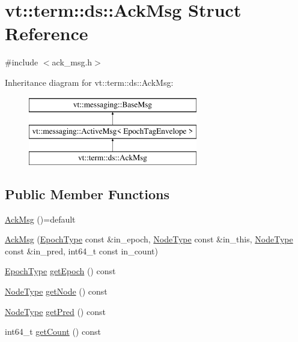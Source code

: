 \hypertarget{structvt_1_1term_1_1ds_1_1_ack_msg}{}\section{vt\+:\+:term\+:\+:ds\+:\+:Ack\+Msg Struct Reference}
\label{structvt_1_1term_1_1ds_1_1_ack_msg}


{\ttfamily \#include $<$ack\+\_\+msg.\+h$>$}

Inheritance diagram for vt\+:\+:term\+:\+:ds\+:\+:Ack\+Msg\+:\begin{figure}[H]
\begin{center}
\leavevmode
\includegraphics[height=3.000000cm]{structvt_1_1term_1_1ds_1_1_ack_msg}
\end{center}
\end{figure}
\subsection*{Public Member Functions}
\begin{DoxyCompactItemize}
\item 
\hyperlink{structvt_1_1term_1_1ds_1_1_ack_msg_aa455e4d0c3e93b196e8fc21f576a5d3e}{Ack\+Msg} ()=default
\item 
\hyperlink{structvt_1_1term_1_1ds_1_1_ack_msg_afa493ae15ad599ef9ed892ab697345d5}{Ack\+Msg} (\hyperlink{namespacevt_a985a5adf291c34a3ca263b3378388236}{Epoch\+Type} const \&in\+\_\+epoch, \hyperlink{namespacevt_a866da9d0efc19c0a1ce79e9e492f47e2}{Node\+Type} const \&in\+\_\+this, \hyperlink{namespacevt_a866da9d0efc19c0a1ce79e9e492f47e2}{Node\+Type} const \&in\+\_\+pred, int64\+\_\+t const in\+\_\+count)
\item 
\hyperlink{namespacevt_a985a5adf291c34a3ca263b3378388236}{Epoch\+Type} \hyperlink{structvt_1_1term_1_1ds_1_1_ack_msg_ac8a4b1762cef1c6c9de8951f47e6abc0}{get\+Epoch} () const
\item 
\hyperlink{namespacevt_a866da9d0efc19c0a1ce79e9e492f47e2}{Node\+Type} \hyperlink{structvt_1_1term_1_1ds_1_1_ack_msg_ab1da752b167852eeb014b1abe78b61be}{get\+Node} () const
\item 
\hyperlink{namespacevt_a866da9d0efc19c0a1ce79e9e492f47e2}{Node\+Type} \hyperlink{structvt_1_1term_1_1ds_1_1_ack_msg_aee8c447d40b6aebf018a7402527a355e}{get\+Pred} () const
\item 
int64\+\_\+t \hyperlink{structvt_1_1term_1_1ds_1_1_ack_msg_a28125b7b99d15c26ebaef2c34f6a5daa}{get\+Count} () const
\end{DoxyCompactItemize}

